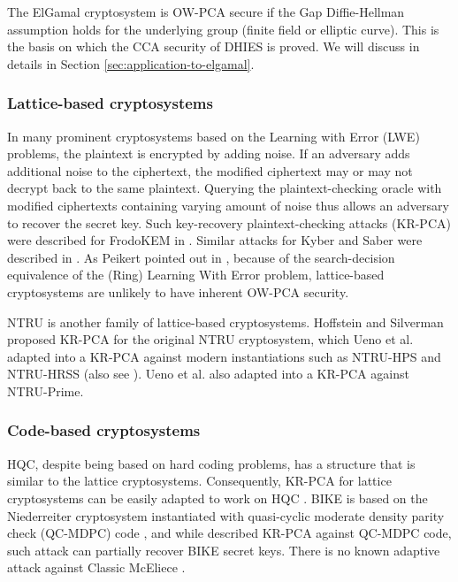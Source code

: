 \documentclass[runningheads]{llncs}
\begin{document}
The ElGamal cryptosystem \cite{DBLP:journals/tit/Elgamal85} is OW-PCA secure if the Gap Diffie-Hellman assumption \cite{DBLP:conf/pkc/OkamotoP01} holds for the underlying group (finite field or elliptic curve). This is the basis on which the CCA security of DHIES \cite{DBLP:conf/ctrsa/AbdallaBR01} is proved. We will discuss in details in Section \ref{sec:application-to-elgamal}.

\subsubsection{Lattice-based cryptosystems} In many prominent cryptosystems based on the Learning with Error (LWE) problems, the plaintext is encrypted by adding noise. If an adversary adds additional noise to the ciphertext, the modified ciphertext may or may not decrypt back to the same plaintext. Querying the plaintext-checking oracle with modified ciphertexts containing varying amount of noise thus allows an adversary to recover the secret key. Such key-recovery plaintext-checking attacks (KR-PCA) were described for FrodoKEM in \cite{DBLP:conf/crypto/GuoJN20,DBLP:conf/eurocrypt/BaetuDHTV19}. Similar attacks for Kyber and Saber were described in \cite{DBLP:conf/acns/Huguenin-Dumittan20,DBLP:conf/asiacrypt/XagawaIUTH21,DBLP:conf/pqcrypto/GuoM23}. As Peikert pointed out in \cite{cryptoeprint:2014/070}, because of the search-decision equivalence of the (Ring) Learning With Error problem, lattice-based cryptosystems are unlikely to have inherent OW-PCA security. 

NTRU is another family of lattice-based cryptosystems. Hoffstein and Silverman \cite{hoffstein1999reaction} proposed KR-PCA for the original NTRU cryptosystem, which Ueno et al. \cite{DBLP:journals/tches/UenoXTITH22} adapted into a KR-PCA against modern instantiations such as NTRU-HPS and NTRU-HRSS (also see \cite{cryptoeprint:2021/168}). Ueno et al. also adapted \cite{DBLP:conf/crypto/JaulmesJ00} into a KR-PCA against NTRU-Prime.

\subsubsection{Code-based cryptosystems} HQC, despite being based on hard coding problems, has a structure that is similar to the lattice cryptosystems. Consequently, KR-PCA for lattice cryptosystems can be easily adapted to work on HQC \cite{DBLP:conf/acns/Huguenin-Dumittan20,DBLP:conf/eurocrypt/BaetuDHTV19}. BIKE is based on the Niederreiter cryptosystem instantiated with quasi-cyclic moderate density parity check (QC-MDPC) code \cite{DBLP:conf/isit/MisoczkiTSB13}, and while \cite{DBLP:conf/asiacrypt/Guo0S16} described KR-PCA against QC-MDPC code, such attack can partially recover BIKE secret keys. There is no known adaptive attack against Classic McEliece  \cite{DBLP:journals/tches/UenoXTITH22}.
\end{document}
